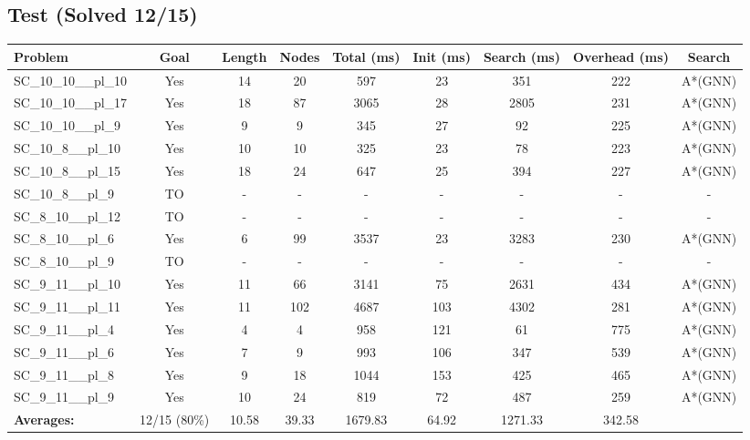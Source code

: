\documentclass{article}
\begin{document}
\subsection*{Test (Solved 12/15)}
\begin{tabular}{lcccccccc}
\toprule
Problem & Goal & Length & Nodes & Total (ms) & Init (ms) & Search (ms) & Overhead (ms) & Search \\
\midrule
SC\_10\_10\_\_pl\_10 & Yes & 14 & 20 & 597 & 23 & 351 & 222 & A*(GNN) \\
SC\_10\_10\_\_pl\_17 & Yes & 18 & 87 & 3065 & 28 & 2805 & 231 & A*(GNN) \\
SC\_10\_10\_\_pl\_9 & Yes & 9 & 9 & 345 & 27 & 92 & 225 & A*(GNN) \\
SC\_10\_8\_\_pl\_10 & Yes & 10 & 10 & 325 & 23 & 78 & 223 & A*(GNN) \\
SC\_10\_8\_\_pl\_15 & Yes & 18 & 24 & 647 & 25 & 394 & 227 & A*(GNN) \\
SC\_10\_8\_\_pl\_9 & TO & - & - & - & - & - & - & - \\
SC\_8\_10\_\_pl\_12 & TO & - & - & - & - & - & - & - \\
SC\_8\_10\_\_pl\_6 & Yes & 6 & 99 & 3537 & 23 & 3283 & 230 & A*(GNN) \\
SC\_8\_10\_\_pl\_9 & TO & - & - & - & - & - & - & - \\
SC\_9\_11\_\_pl\_10 & Yes & 11 & 66 & 3141 & 75 & 2631 & 434 & A*(GNN) \\
SC\_9\_11\_\_pl\_11 & Yes & 11 & 102 & 4687 & 103 & 4302 & 281 & A*(GNN) \\
SC\_9\_11\_\_pl\_4 & Yes & 4 & 4 & 958 & 121 & 61 & 775 & A*(GNN) \\
SC\_9\_11\_\_pl\_6 & Yes & 7 & 9 & 993 & 106 & 347 & 539 & A*(GNN) \\
SC\_9\_11\_\_pl\_8 & Yes & 9 & 18 & 1044 & 153 & 425 & 465 & A*(GNN) \\
SC\_9\_11\_\_pl\_9 & Yes & 10 & 24 & 819 & 72 & 487 & 259 & A*(GNN) \\
\textbf{Averages:} & 12/15 (80\%) & 10.58 & 39.33 & 1679.83 & 64.92 & 1271.33 & 342.58 & \\
\bottomrule
\end{tabular}
\\[0.7cm]
\end{document}
